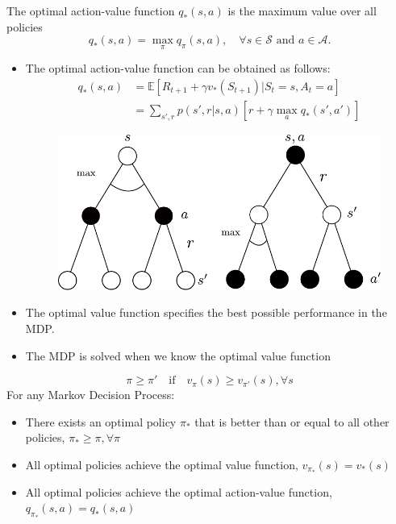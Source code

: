 \begin{definition}
	The optimal action-value function $q_{*}(s, a)$ is the maximum value over all policies
	$$q_{*}(s,a) = \max_{\pi} q_{\pi}(s,a), \quad \forall s\in \mathcal{S} \textrm{ and } a\in \mathcal{A}.$$
\end{definition}
\begin{itemize}
	\item The optimal action-value function can be obtained as follows:
		\begin{align*}
		q_{*}(s,a) &= \mathbb{E}[R_{t+1}+\gamma v_*(S_{t+1})|S_t=s, A_t=a]\\
		&= \sum_{s',r}p(s',r|s,a)[r + \gamma \max_a q_*(s',a')]
		\end{align*}
		\begin{figure}[h]
			\centering
			\includegraphics[scale=0.5]{./images/optimal_action.pdf}
		\end{figure}
	\item The optimal value function specifies the best possible performance in the MDP.
	\item The MDP is solved when we know the optimal value function
\end{itemize}

\begin{theorem}
	$$\pi\geq \pi' \quad\textrm{if}\quad v_\pi(s) \geq v_{\pi'}(s), \forall s$$
	For any Markov Decision Process:
	\begin{itemize}
		\item There exists an optimal policy $\pi_*$ that is better than or equal to all other policies, $\pi_*\geq \pi, \forall \pi$
		\item All optimal policies achieve the optimal value function, $v_{\pi_*}(s) = v_*(s)$
		\item All optimal policies achieve the optimal action-value function, $q_{\pi_*}(s,a) = q_{*}(s,a)$
	\end{itemize}
\end{theorem}

